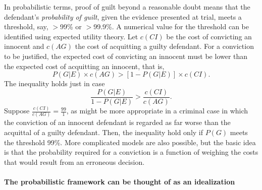 \documentclass[10pt]{article}
\begin{document}
In probabilistic terms, proof of guilt beyond a reasonable doubt means 
that the defendant's \textit{probability of guilt}, given the evidence presented at trial, meets a 
threshold, say, $>$99\% or $>$99.9\%. 
%
A numerical value for the threshold can be identified using expected utility theory. 
Let $c(CI)$ be the cost of convicting an innocent and $c(AG)$ the cost 
of acquitting a guilty defendant. For a conviction to be justified, the 
expected cost of convicting an innocent must be lower than the expected 
cost of acquitting an innocent, that is, 
%
\[ P(G|E) \times c(AG) >  [1-P(G|E)] \times c(CI) .\]
%
The inequality holds just in case 
%
\[ \frac{P(G|E)}{1- P(G|E)} > \frac{c(CI)}{c(AG)}.\]
%
Suppose $ \frac{c(CI)}{c(AG)}=\frac{99}{1}$, as might be more appropriate in a criminal 
case in which the conviction of an innocent defendant is regarded as far worse than the acquittal of a guilty defendant.
Then, the inequality hold only if $P(G)$ meets the threshold 99\%.
More complicated models are also possible, but the basic idea is that the probability 
required for a conviction is a function of weighing the 
costs that would result from an erroneous decision. 


\paragraph{The probabilistic framework can be thought of as an idealization}
\end{document}
